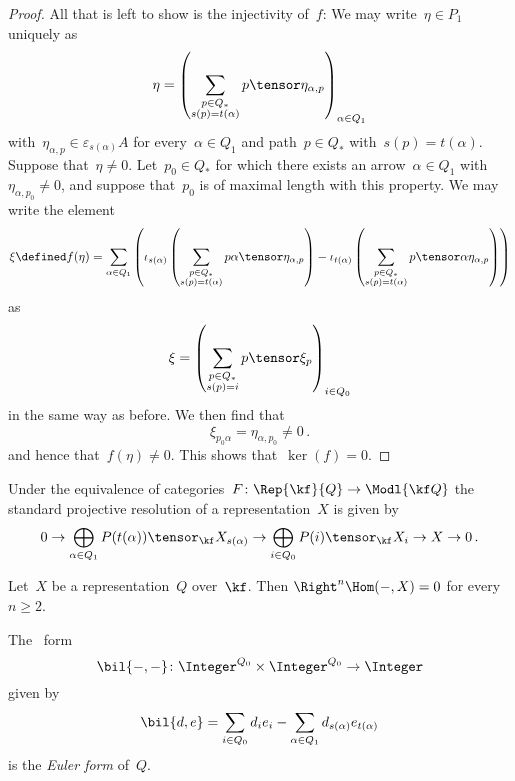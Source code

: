 \begin{proof}
  All that is left to show is the injectivity of~$f$:
  We may write~$\eta \in P_1$ uniquely as
  \[
    \eta
    =
    \left(
      \sum_{\substack{p \in Q_* \\ s(p) = t(\alpha)}}
      p \tensor \eta_{\alpha,p}
    \right)_{\alpha \in Q_1}
  \]
  with~$\eta_{\alpha, p} \in \varepsilon_{s(\alpha)} A$ for every~$\alpha \in Q_1$ and path~$p \in Q_*$ with~$s(p) = t(\alpha)$.
  Suppose that~$\eta \neq 0$.
  Let~$p_0 \in Q_*$ for which there exists an arrow~$\alpha \in Q_1$ with~$\eta_{\alpha, p_0} \neq 0$, and suppose that~$p_0$ is of maximal length with this property.
 We may write the element
  \[
    \xi
    \defined
    f(\eta)
    =
    \sum_{\alpha \in Q_1}
    \left(
      \iota_{s(\alpha)}
      \left(
        \sum_{\substack{p \in Q_* \\ s(p) = t(\alpha)}}
        p \alpha \tensor \eta_{\alpha,p}
      \right)
      -
      \iota_{t(\alpha)}
      \left(
        \sum_{\substack{p \in Q_* \\ s(p) = t(\alpha)}}
        p \tensor \alpha \eta_{\alpha,p}
      \right)
    \right)
  \]
  as
  \[
    \xi
    =
    \left(
      \sum_{\substack{p \in Q_* \\ s(p) = i}}
      p \tensor \xi_p
    \right)_{i \in Q_0}
  \]
  in the same way as before.
  We then find that
  \[
    \xi_{p_0 \alpha}
    =
    \eta_{\alpha, p_0}
    \neq
    0 \,.
  \]
  and hence that~$f(\eta) \neq 0$.
  This shows that~$\ker(f) = 0$.
\end{proof}


\begin{remark}
  Under the equivalence of categories~$F \colon \Rep{\kf}{Q} \to \Modl{\kf Q}$ the standard projective resolution of a representation~$X$ is given by
  \[
    0
    \to
    \bigoplus_{\alpha \in Q_1}
    P(t(\alpha)) \tensor_\kf X_{s(\alpha)}
    \to
    \bigoplus_{i \in Q_0}
    P(i) \tensor_\kf X_i
    \to
    X
    \to
    0 \,.
  \]
\end{remark}


\begin{corollary}
  Let~$X$ be a representation~$Q$ over~$\kf$.
  Then $\Right^n \Hom(-,X) = 0$ for every~$n \geq 2$.
\end{corollary}


\begin{definition}
  The~ form
  \[
    \bil{-,-}
    \colon
    \Integer^{Q_0} \times \Integer^{Q_0}
    \to
    \Integer
  \]
  given by
  \[
    \bil{d,e}
    =
    \sum_{i \in Q_0}
    d_i e_i
    -
    \sum_{\alpha \in Q_1}
    d_{s(\alpha)} e_{t(\alpha)}
  \]
  is the \emph{Euler form} of~$Q$.
\end{definition}


